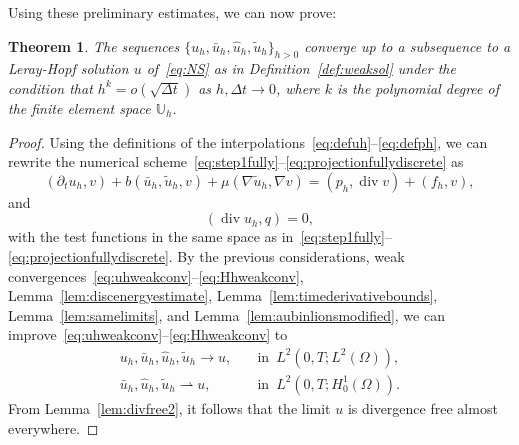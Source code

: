 \documentclass[10pt,letterpaper]{amsart}
\newcommand{\tu}{\widetilde{u}}
\newcommand{\hu}{\widehat{u}}
\newcommand{\Grad}{\nabla}
\newcommand{\Div}{\operatorname{div}}
\newcommand{\dom}{\Omega}
\newcommand{\Uh}{\mathbb{U}_h}
\newcommand{\weak}{\rightharpoonup}
\newtheorem{theorem}[lemma]{Theorem}
\theoremstyle{definition}{\newtheorem{definition}[lemma]{Definition}}
\numberwithin{equation}{section}
\begin{document}
Using these preliminary estimates, we can now prove:
\begin{theorem}\label{thm:convergence}
	The sequences $\{u_h,\bar{u}_h,\hu_h,\widetilde{u}_h \}_{h>0}$ converge up to a subsequence to a Leray-Hopf solution $u$ of~\eqref{eq:NS} as in Definition~\ref{def:weaksol} under the condition that {$h^k = o(\sqrt{\Delta t})$} as $h,\Delta t\to 0$, where $k$ is the polynomial degree of the finite element space $\Uh$.
\end{theorem}
\begin{proof}
	Using the definitions of the interpolations~\eqref{eq:defuh}--\eqref{eq:defph}, we can rewrite the numerical scheme~\eqref{eq:step1fully}--\eqref{eq:projectionfullydiscrete} as
		\begin{equation}
			\label{eq:udiscinterp}
			\left(\partial_t u_h,v\right)+ b(\bar{u}_h,\tu_h,v)+\mu(\Grad \tu_h,\Grad v) = (p_h,\Div v)+(f_h,v),
		\end{equation}
			and 
	\begin{equation}
		\label{eq:divconstraintinterp}
		(\Div u_h,q)=0,
	\end{equation}
	with the test functions in the same space as in~\eqref{eq:step1fully}--\eqref{eq:projectionfullydiscrete}.
	By the previous considerations, weak convergences~\eqref{eq:uhweakconv}--\eqref{eq:Hhweakconv}, Lemma~\ref{lem:discenergyestimate}, Lemma~\ref{lem:timederivativebounds}, Lemma~\ref{lem:samelimits}, and Lemma~\ref{lem:aubinlionsmodified}, we can improve~\eqref{eq:uhweakconv}--\eqref{eq:Hhweakconv} to
	\begin{align}
		u_h,\bar{u}_h,\hu_h,\widetilde{u}_h\to u,&\quad \text{in }\, L^2(0,T;L^2(\dom)),\label{eq:uhstrongconv}\\
		\bar{u}_h,\hu_h,\widetilde{u}_h\weak u,&\quad \text{in }\, L^2(0,T;H^1_0(\dom)).\label{eq:tuhweakconvagain}
	\end{align}
	From Lemma~\ref{lem:divfree2}, it follows that the limit $u$ is divergence free almost everywhere.
%	
%	
%	
%	
%	
%	
%	
%	
	

\end{proof}
\end{document}
